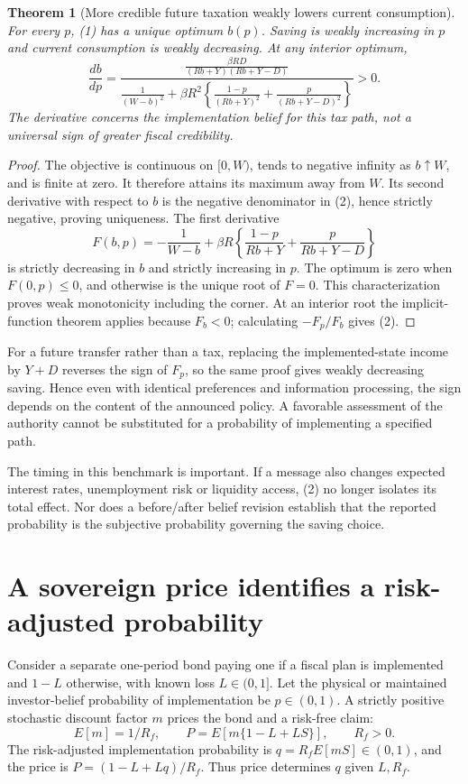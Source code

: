 \documentclass[11pt]{article}
\newtheorem{theorem}{Theorem}
\theoremstyle{definition}
\begin{document}
\begin{theorem}[More credible future taxation weakly lowers current consumption]
For every $p$, (1) has a unique optimum $b(p)$. Saving is weakly increasing in $p$ and current consumption is weakly decreasing. At any interior optimum,
\[
 \frac{db}{dp}=
 \frac{\displaystyle\frac{\beta R D}{(Rb+Y)(Rb+Y-D)}}
 {\displaystyle\frac1{(W-b)^2}+\beta R^2\left\{
 \frac{1-p}{(Rb+Y)^2}+\frac p{(Rb+Y-D)^2}\right\}}>0.
 \tag{2}
\]
The derivative concerns the implementation belief for this tax path, not a universal sign of greater fiscal credibility.
\end{theorem}
\begin{proof}
The objective is continuous on $[0,W)$, tends to negative infinity as $b\uparrow W$, and is finite at zero. It therefore attains its maximum away from $W$. Its second derivative with respect to $b$ is the negative denominator in (2), hence strictly negative, proving uniqueness. The first derivative
\[
 F(b,p)=-\frac1{W-b}+\beta R\left\{\frac{1-p}{Rb+Y}
                           +\frac p{Rb+Y-D}\right\}
\]
is strictly decreasing in $b$ and strictly increasing in $p$. The optimum is zero when $F(0,p)\le0$, and otherwise is the unique root of $F=0$. This characterization proves weak monotonicity including the corner. At an interior root the implicit-function theorem applies because $F_b<0$; calculating $-F_p/F_b$ gives (2).
\end{proof}
For a future transfer rather than a tax, replacing the implemented-state income by $Y+D$ reverses the sign of $F_p$, so the same proof gives weakly decreasing saving. Hence even with identical preferences and information processing, the sign depends on the content of the announced policy. A favorable assessment of the authority cannot be substituted for a probability of implementing a specified path.

The timing in this benchmark is important. If a message also changes expected interest rates, unemployment risk or liquidity access, (2) no longer isolates its total effect. Nor does a before/after belief revision establish that the reported probability is the subjective probability governing the saving choice.

\section*{A sovereign price identifies a risk-adjusted probability}
Consider a separate one-period bond paying one if a fiscal plan is implemented and $1-L$ otherwise, with known loss $L\in(0,1]$. Let the physical or maintained investor-belief probability of implementation be $p\in(0,1)$. A strictly positive stochastic discount factor $m$ prices the bond and a risk-free claim:
\[
 E[m]=1/R_f,\qquad
 P=E[m\{1-L+LS\}],\qquad R_f>0.
\]
The risk-adjusted implementation probability is $q=R_fE[mS]\in(0,1)$, and the price is $P=(1-L+Lq)/R_f$. Thus price determines $q$ given $L,R_f$.
\end{document}
